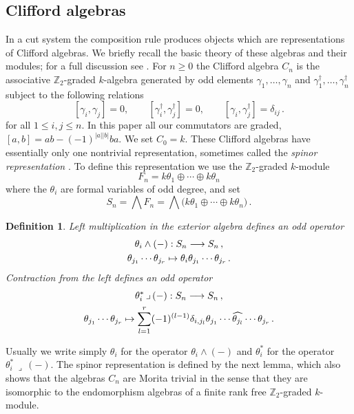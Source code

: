 \documentclass[english,letter paper,12pt,leqno]{article}
\theoremstyle{example}
\newtheorem{definition}[theorem]{Definition}
\numberwithin{equation}{section}
\def\be{\begin{equation}}
\def\ee{\end{equation}}
\def\nZ{\mathds{Z}}
\begin{document}
\subsection{Clifford algebras}\label{section:clifford_algs}

In a cut system the composition rule produces objects which are representations of Clifford algebras. We briefly recall the basic theory of these algebras and their modules; for a full discussion see \cite{friedrich}. For $n \ge 0$ the Clifford algebra $C_n$ is the associative $\mathbb{Z}_2$-graded $k$-algebra generated by odd elements $\gamma_1,\ldots,\gamma_n$ and $\gamma_1^\dagger, \ldots, \gamma_n^\dagger$ subject to the following relations
\be\label{eq:clifford_relations}
[\gamma_i, \gamma_j] = 0, \qquad [\gamma_i^\dagger, \gamma_j^\dagger] = 0, \qquad [\gamma_i, \gamma_j^\dagger] = \delta_{ij}\,.
\ee
for all $1 \le i, j \le n$. In this paper all our commutators are graded, $[a,b] = ab - (-1)^{|a||b|} ba$. We set $C_0 = k$. These Clifford algebras have essentially only one nontrivial representation, sometimes called the \emph{spinor representation} \cite[p.14]{friedrich}. To define this representation we use the $\nZ_2$-graded $k$-module
\[
F_n = k \theta_1 \oplus \cdots \oplus k \theta_n
\]
where the $\theta_i$ are formal variables of odd degree, and set
\be
S_n = \bigwedge F_n = \bigwedge\big( k \theta_1 \oplus \cdots \oplus k \theta_n \big)\,.
\ee

\begin{definition}\label{defn:contraction} Left multiplication in the exterior algebra defines an odd operator
\begin{gather*}
\theta_i \wedge (-): S_n \longrightarrow S_n\,,\\
\theta_{j_1} \cdots \theta_{j_r} \mapsto \theta_i \theta_{j_1} \cdots \theta_{j_r}\,.
\end{gather*}
Contraction from the left defines an odd operator
\begin{gather*}
\theta_i^*\, \lrcorner\, (-): S_n \longrightarrow S_n\,,\\
\theta_{j_1} \cdots \theta_{j_r} \mapsto \sum_{l=1}^r (-1)^{(l-1)} \delta_{i,j_l} \theta_{j_1} \cdots \widehat{ \theta_{j_l} } \cdots \theta_{j_r}\,.
\end{gather*}
\end{definition}

Usually we write simply $\theta_i$ for the operator $\theta_i \wedge (-)$ and $\theta_i^*$ for the operator $\theta_i^*\, \lrcorner\, (-)$. The spinor representation is defined by the next lemma, which also shows that the algebras $C_n$ are Morita trivial in the sense that they are isomorphic to the endomorphism algebras of a finite rank free $\mathbb{Z}_2$-graded $k$-module.
\end{document}
